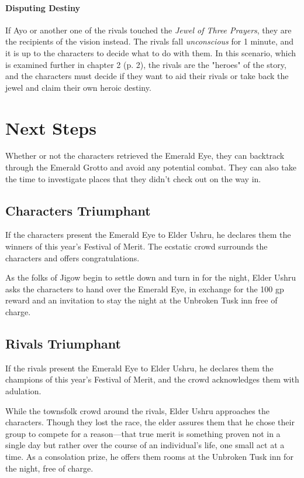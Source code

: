 \documentclass[a4paper, 11pt, bg=full, twocolumn, nooutline]{dndbook}
\begin{document}
\paragraph{Disputing Destiny}

If Ayo or another one of the rivals touched the \textit{Jewel of Three Prayers}, they are the recipients of the vision instead. The rivals fall \textit{unconscious} for 1 minute, and it is up to the characters to decide what to do with them. In this scenario, which is examined further in chapter 2 (p. 2), the rivals are the "heroes" of the story, and the characters must decide if they want to aid their rivals or take back the jewel and claim their own heroic destiny.

\section{Next Steps}

Whether or not the characters retrieved the Emerald Eye, they can backtrack through the Emerald Grotto and avoid any potential combat. They can also take the time to investigate places that they didn't check out on the way in.

\subsection{Characters Triumphant}

If the characters present the Emerald Eye to Elder Ushru, he declares them the winners of this year's Festival of Merit. The ecstatic crowd surrounds the characters and offers congratulations.

As the folks of Jigow begin to settle down and turn in for the night, Elder Ushru asks the characters to hand over the Emerald Eye, in exchange for the 100 gp reward and an invitation to stay the night at the Unbroken Tusk inn free of charge.

\subsection{Rivals Triumphant}

If the rivals present the Emerald Eye to Elder Ushru, he declares them the champions of this year's Festival of Merit, and the crowd acknowledges them with adulation.

While the townsfolk crowd around the rivals, Elder Ushru approaches the characters. Though they lost the race, the elder assures them that he chose their group to compete for a reason---that true merit is something proven not in a single day but rather over the course of an individual's life, one small act at a time. As a consolation prize, he offers them rooms at the Unbroken Tusk inn for the night, free of charge.
\end{document}
